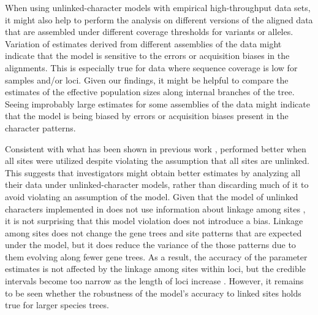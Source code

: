 When using unlinked-character models with empirical high-throughput data sets,
it might also help to perform the analysis on different versions of the aligned
data that are assembled under different coverage thresholds for variants or
alleles.
Variation of estimates derived from different assemblies of the data might
indicate that the model is sensitive to the errors or acquisition biases in the
alignments.
This is especially true for data where sequence coverage is low for samples
and/or loci.
Given our findings, it might be helpful to compare the estimates of the
effective population sizes along internal branches of the tree.
Seeing improbably large estimates for some assemblies of the
data might indicate that the model is being biased by
errors or acquisition biases present in the character patterns.

Consistent with what has been shown in previous work
\citep{Oaks2018ecoevolity,oaks2019comparative},
\ecoevolity performed better when all sites were utilized despite violating the
assumption that all sites are unlinked.
This suggests that investigators might obtain better estimates by analyzing all
their data under unlinked-character models, rather than discarding much of it
to avoid violating an assumption of the model.
Given that the model of unlinked characters implemented in \ecoevolity
does not use information about linkage among sites 
\citep{bryantInferringSpeciesTrees2012, Oaks2018ecoevolity},
it is not surprising that this model violation does not introduce a bias.
Linkage among sites does not change the gene trees and site patterns that are
expected under the model, but it does reduce the variance of the those patterns
due to them evolving along fewer gene trees.
As a result, the accuracy of the parameter estimates is not affected
by the linkage among sites within loci, but the credible intervals
become too narrow as the length of loci increase
\citep{Oaks2018ecoevolity,oaks2019comparative}.
However, it remains to be seen whether the robustness of the model's accuracy
to linked sites holds true for larger species trees.


